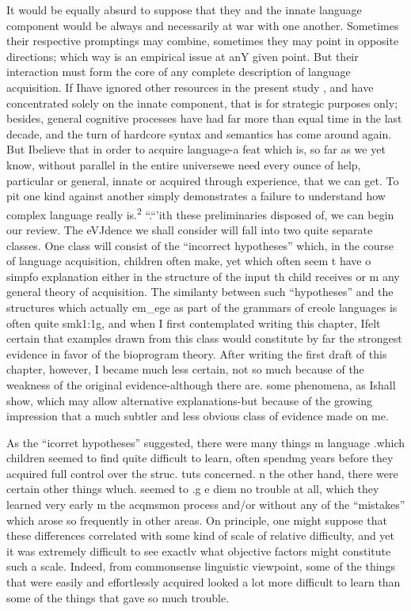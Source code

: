 It would be equally absurd to suppose that they and the innate language component would be always and necessarily at war with one another. Sometimes their respective promptings may combine, some\-times they may point in opposite directions; which way is an empirical issue at anY given point. But their interaction must form the core of any complete description of language acquisition. If Ihave ignored
other resources in the present study , and have concentrated solely on the innate component, that is for strategic purposes only; besides, general cognitive processes have had far more than equal time in the last decade, and the turn of hardcore syntax and semantics has come around again. But Ibelieve that in order to acquire language-a feat which is, so far as we yet know, without parallel in the entire universe\-we need every ounce of help, particular or general, innate or acquired through experience, that we can get. To pit one kind against another simply demonstrates a failure to understand how complex language really is.\textsuperscript{2}
``.``'ith these preliminaries disposed of, we can begin our review. The eVJdence we shall consider will fall into two quite separate classes. One class will consist of the ``incorrect hypotheses'' which, in the course of language acquisition, children often make, yet which often seem t have o simpfo explanation either in the structure of the input th child receives or m any general theory of acquisition. The simi\-lanty between such ``hypotheses'' and the structures which actually em\_ege as part of the grammars of creole languages is often quite smk1:1g, and when I first contemplated writing this chapter, Ifelt certain that examples drawn from this class would constitute by far
the strongest evidence in favor of the bioprogram theory. After writing
the first draft of this chapter, however, I became much less certain, not so much because of the weakness of the original evidence-although there are. some phenomena, as Ishall show, which may allow alternative explanations-but because of the growing impression that a much subtler and less obvious class of evidence made on me.

As the ``icorret hypotheses'' suggested, there were many things m language .which children seemed to find quite difficult to learn, often spendmg years before they acquired full control over the struc. tuts concerned. n the other hand, there were certain other things wluch. seemed to .g e diem no trouble at all, which they learned very early m the acqmsmon process and/or without any of the ``mistakes'' which arose so frequently in other areas. On principle, one might suppose that these differences correlated with some kind of scale of relative difficulty, and yet it was extremely difficult to see exactlv what objective factors might constitute such a scale. Indeed, from commonsense linguistic viewpoint, some of the things that were easily and effortlessly acquired looked a lot more difficult to learn than some of the things that gave so much trouble.


